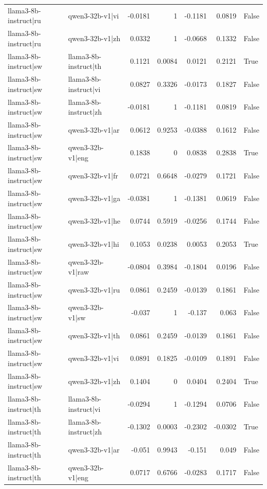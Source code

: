 \begin{table}
\begin{tabular}{l l r r r r l}
llama3-8b-instruct|ru & qwen3-32b-v1|vi & -0.0181 & 1 & -0.1181 & 0.0819 & False \\
llama3-8b-instruct|ru & qwen3-32b-v1|zh & 0.0332 & 1 & -0.0668 & 0.1332 & False \\
llama3-8b-instruct|sw & llama3-8b-instruct|th & 0.1121 & 0.0084 & 0.0121 & 0.2121 & True \\
llama3-8b-instruct|sw & llama3-8b-instruct|vi & 0.0827 & 0.3326 & -0.0173 & 0.1827 & False \\
llama3-8b-instruct|sw & llama3-8b-instruct|zh & -0.0181 & 1 & -0.1181 & 0.0819 & False \\
llama3-8b-instruct|sw & qwen3-32b-v1|ar & 0.0612 & 0.9253 & -0.0388 & 0.1612 & False \\
llama3-8b-instruct|sw & qwen3-32b-v1|eng & 0.1838 & 0 & 0.0838 & 0.2838 & True \\
llama3-8b-instruct|sw & qwen3-32b-v1|fr & 0.0721 & 0.6648 & -0.0279 & 0.1721 & False \\
llama3-8b-instruct|sw & qwen3-32b-v1|ga & -0.0381 & 1 & -0.1381 & 0.0619 & False \\
llama3-8b-instruct|sw & qwen3-32b-v1|he & 0.0744 & 0.5919 & -0.0256 & 0.1744 & False \\
llama3-8b-instruct|sw & qwen3-32b-v1|hi & 0.1053 & 0.0238 & 0.0053 & 0.2053 & True \\
llama3-8b-instruct|sw & qwen3-32b-v1|raw & -0.0804 & 0.3984 & -0.1804 & 0.0196 & False \\
llama3-8b-instruct|sw & qwen3-32b-v1|ru & 0.0861 & 0.2459 & -0.0139 & 0.1861 & False \\
llama3-8b-instruct|sw & qwen3-32b-v1|sw & -0.037 & 1 & -0.137 & 0.063 & False \\
llama3-8b-instruct|sw & qwen3-32b-v1|th & 0.0861 & 0.2459 & -0.0139 & 0.1861 & False \\
llama3-8b-instruct|sw & qwen3-32b-v1|vi & 0.0891 & 0.1825 & -0.0109 & 0.1891 & False \\
llama3-8b-instruct|sw & qwen3-32b-v1|zh & 0.1404 & 0 & 0.0404 & 0.2404 & True \\
llama3-8b-instruct|th & llama3-8b-instruct|vi & -0.0294 & 1 & -0.1294 & 0.0706 & False \\
llama3-8b-instruct|th & llama3-8b-instruct|zh & -0.1302 & 0.0003 & -0.2302 & -0.0302 & True \\
llama3-8b-instruct|th & qwen3-32b-v1|ar & -0.051 & 0.9943 & -0.151 & 0.049 & False \\
llama3-8b-instruct|th & qwen3-32b-v1|eng & 0.0717 & 0.6766 & -0.0283 & 0.1717 & False \\

\end{tabular}
\end{table}
